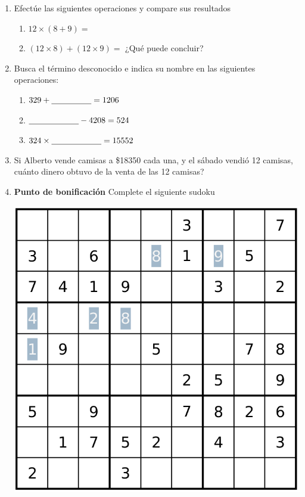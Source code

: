 \documentclass[fleqn]{article}
\begin{document}
\begin{enumerate}
  \item Efectúe las siguientes operaciones y compare sus resultados
  \begin{enumerate}
  \item $12\times (8+9)=$\noanswer
  \item $(12 \times 8)+(12\times 9)=$ \noanswer
  ¿Qué puede concluir?\noanswer
  \end{enumerate}
   \item Busca el término desconocido e indica su nombre en las siguientes operaciones:
   \begin{enumerate}
   \item $329+\underline{\hspace*{48pt}}=1206$\noanswer
   \item $\underline{\hspace*{60pt}}-4208=524$\noanswer
   \item $324\times \underline{\hspace*{60pt}}=15552 $\noanswer
   \end{enumerate}
   \item Si Alberto vende camisas a \$18350 cada una, y el sábado vendió 12 camisas, cuánto dinero obtuvo de la venta de las 12 camisas?\noanswer
   \item \textbf{Punto de bonificación} Complete el siguiente sudoku
   
   \includegraphics[scale=.25]{Images/sudoku02.png} 
\end{enumerate}
\end{document}
